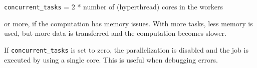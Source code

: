 \Verb+concurrent_tasks+ = 2 * number of (hyperthread) cores in the workers

or more, if the computation has memory issues. With more tasks, less memory is
used, but more data is transferred and the computation becomes slower.

If \Verb+concurrent_tasks+ is set to zero, the parallelization is disabled and the
job is executed by using a single core. This is useful when debugging errors.
